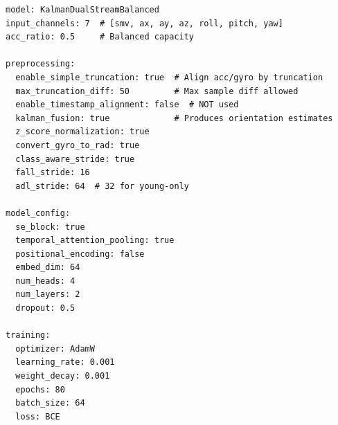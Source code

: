 \documentclass{article}
\begin{document}
\begin{verbatim}
model: KalmanDualStreamBalanced
input_channels: 7  # [smv, ax, ay, az, roll, pitch, yaw]
acc_ratio: 0.5     # Balanced capacity

preprocessing:
  enable_simple_truncation: true  # Align acc/gyro by truncation
  max_truncation_diff: 50         # Max sample diff allowed
  enable_timestamp_alignment: false  # NOT used
  kalman_fusion: true             # Produces orientation estimates
  z_score_normalization: true
  convert_gyro_to_rad: true
  class_aware_stride: true
  fall_stride: 16
  adl_stride: 64  # 32 for young-only

model_config:
  se_block: true
  temporal_attention_pooling: true
  positional_encoding: false
  embed_dim: 64
  num_heads: 4
  num_layers: 2
  dropout: 0.5

training:
  optimizer: AdamW
  learning_rate: 0.001
  weight_decay: 0.001
  epochs: 80
  batch_size: 64
  loss: BCE
\end{verbatim}
\end{document}
